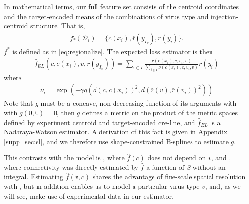 In mathematical terms, our full feature set consists of the centroid coordinates and the target-encoded means of the combinations of virus type and injection-centroid structure.
That is, 
\begin{eqnarray*}
f_*({\mathcal D}_i) = \{c(x_i) , \bar r(y_{I_v}), r(y_i) \}.
\end{eqnarray*}
$f^*$ is defined as in \eqref{eq:regionalize}. The expected loss estimator is then 
\begin{eqnarray*}
\hat f_{EL} (c, c(x_i),v , r(y_{I_v})) =  \sum_{i \in I} \frac{ \nu {(c(x_i) , c, v_i, v)}}{\sum_{i \in I} \nu {(c(x_i) , c, v_i, v) }} r(y_i)
\end{eqnarray*}
where
\begin{eqnarray*}
\nu_i = \exp (- \gamma g( d(c, c(x_i))^2, d(\bar r (v), \bar r (v_i))^2))
\end{eqnarray*}
Note that $g$ must be a concave, non-decreasing function of its arguments with with $g(0,0) = 0$, then $g$ defines a metric on the product of the metric spaces defined by experiment centroid and target-encoded cre-line, and $\hat f_{EL}$ is a Nadaraya-Watson estimator.  A derivation of this fact is given in Appendix \ref{supp_sec:el}, and we therefore use shape-constrained B-splines to estimate $g$.

This contrasts with the model is \citet{Knox2019-ot}, where $\hat f(c)$ does not depend on $v$, and \citet{Oh2014-kh}, where connectivity was directly estimated by $\hat f$ a function of $S$ without an integral.
Estimating $\hat f(v, c)$ shares the advantage of fine-scale spatial resolution with \citet{Knox2019-ot}, but in addition enables us to model a particular virus-type $v$, and, as we will see, make use of experimental data in our estimator.






